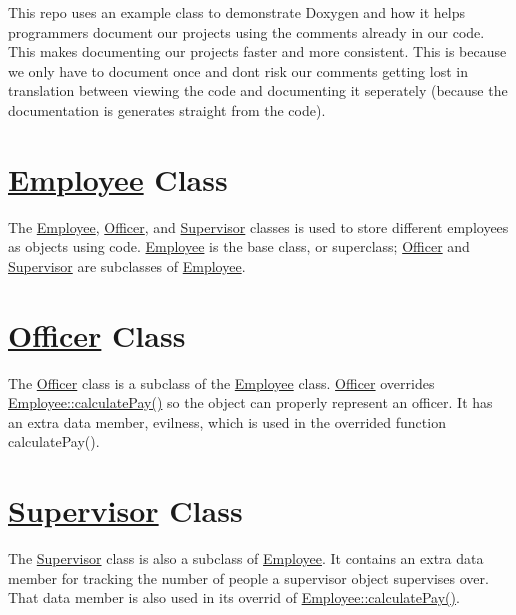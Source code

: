 This repo uses an example class to demonstrate Doxygen and how it helps programmers document our projects using the comments already in our code. This makes documenting our projects faster and more consistent. This is because we only have to document once and don\textquotesingle{}t risk our comments getting lost in translation between viewing the code and documenting it seperately (because the documentation is generates straight from the code).

\section*{\hyperlink{classEmployee}{Employee} Class}

The \hyperlink{classEmployee}{Employee}, \hyperlink{classOfficer}{Officer}, and \hyperlink{classSupervisor}{Supervisor} classes is used to store different employees as objects using code. \hyperlink{classEmployee}{Employee} is the base class, or superclass; \hyperlink{classOfficer}{Officer} and \hyperlink{classSupervisor}{Supervisor} are subclasses of \hyperlink{classEmployee}{Employee}.



\section*{\hyperlink{classOfficer}{Officer} Class}

The \hyperlink{classOfficer}{Officer} class is a subclass of the \hyperlink{classEmployee}{Employee} class. \hyperlink{classOfficer}{Officer} overrides \hyperlink{classEmployee_a01c2c44e15434237db28832f6972e960}{Employee\+::calculate\+Pay()} so the object can properly represent an officer. It has an extra data member, evilness, which is used in the overrided function calculate\+Pay().

\section*{\hyperlink{classSupervisor}{Supervisor} Class}

The \hyperlink{classSupervisor}{Supervisor} class is also a subclass of \hyperlink{classEmployee}{Employee}. It contains an extra data member for tracking the number of people a supervisor object supervises over. That data member is also used in its overrid of \hyperlink{classEmployee_a01c2c44e15434237db28832f6972e960}{Employee\+::calculate\+Pay()}. 